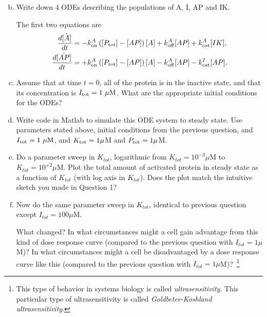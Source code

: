 \documentclass{exam}
\begin{document}
\begin{enumerate}[a.]
\setcounter{enumi}{1}
\item Write down 4 ODEs describing the populations of A, I, AP and IK.  

The first two equations are
\begin{align}
\frac{d\dot{[A]}}{dt} &= -k_{\rm on}^A \left( [P_{\rm tot}] - [AP]\right) [A] + k_{\rm off}^A [AP] + k_{\rm cat}^A [IK],\\
\frac{d\dot{[AP]}}{dt} &= +k_{\rm on}^A \left( [P_{\rm tot}] - [AP]\right) [A] - k_{\rm off}^A [AP] - k_{\rm cat}^I [AP].
\end{align}

\item Assume that at time $t=0$, all of the protein is in the inactive state, and that its concentration is $I_{\rm tot}=1~\mu\mbox{M}$. What are the appropriate initial conditions for the ODEs?

\item Write code in Matlab to simulate this ODE system to steady state. Use parameters stated above, initial conditions from the previous question, and $I_{\rm tot}=1~\mu\mbox{M}$, and $K_{\rm tot}=1\mu$M and $P_{\rm tot}=1\mu$M.

\item Do a parameter sweep in $K_{tot}$, logarithmic from $K_{tot} = 10^{-3} \mu$M to $K_{tot} = 10^{+2} \mu$M. Plot the total amount of activated protein in steady state as a function of $K_{tot}$ (with log axis in $K_{tot}$). Does the plot match the intuitive sketch you made in Question 1? 



\item Now do the same parameter sweep in $K_{tot}$, identical to previous question except $I_{tot}=100\mu$M. 

What changed? In what circumstances might a cell gain advantage from this kind of dose response curve (compared to the previous question with $I_{tot}=1\mu$M)? In what circumstances might a cell be disadvantaged by a dose response curve like this (compared to the previous question with $I_{tot}=1\mu$M)?~\footnote{This type of behavior in systems biology is called \emph{ultrasensitivity}. This particular type of ultrasensitivity is called \emph{Goldbeter-Koshland ultrasensitivity}.}


\end{enumerate}





  
\end{document}
